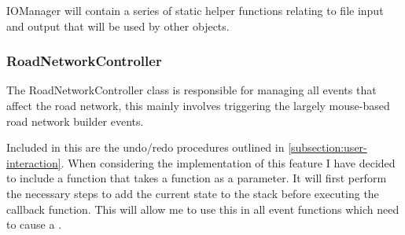             IOManager will contain a series of static helper functions relating to file input and output that will be used by other objects.


        \subsubsection{RoadNetworkController}

            The RoadNetworkController class is responsible for managing all events that affect the road network, this mainly involves triggering the largely mouse-based road network builder events.

            Included in this are the undo/redo procedures outlined in \autoref{subsection:user-interaction}. When considering the implementation of this feature I have decided to include a  function that takes a function as a parameter. It will first perform the necessary steps to add the current state to the stack before executing the callback function. This will allow me to use this in all event functions which need to cause a .


